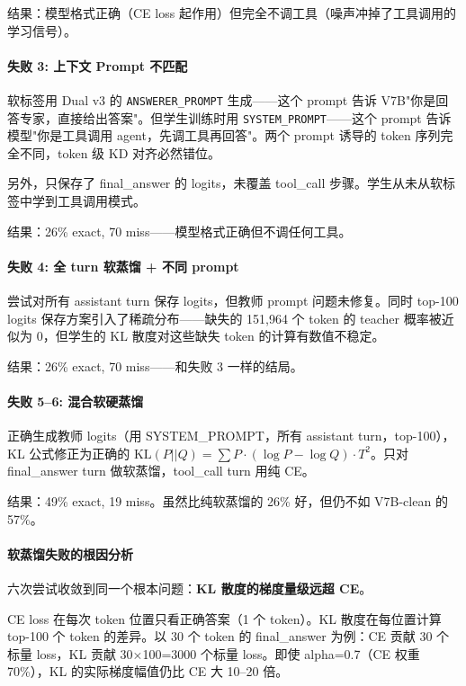\documentclass[12pt,a4paper]{ctexart}
\begin{document}
结果：模型格式正确（CE loss 起作用）但完全不调工具（噪声冲掉了工具调用的学习信号）。

\paragraph*{失败 3: 上下文 Prompt 不匹配}

软标签用 Dual v3 的 \texttt{ANSWERER\_PROMPT} 生成——这个 prompt 告诉 V7B"你是回答专家，直接给出答案"。但学生训练时用 \texttt{SYSTEM\_PROMPT}——这个 prompt 告诉模型"你是工具调用 agent，先调工具再回答"。两个 prompt 诱导的 token 序列完全不同，token 级 KD 对齐必然错位。

另外，只保存了 final\_answer 的 logits，未覆盖 tool\_call 步骤。学生从未从软标签中学到工具调用模式。

结果：26\% exact, 70 miss——模型格式正确但不调任何工具。

\paragraph*{失败 4: 全 turn 软蒸馏 + 不同 prompt}

尝试对所有 assistant turn 保存 logits，但教师 prompt 问题未修复。同时 top-100 logits 保存方案引入了稀疏分布——缺失的 151,964 个 token 的 teacher 概率被近似为 0，但学生的 KL 散度对这些缺失 token 的计算有数值不稳定。

结果：26\% exact, 70 miss——和失败 3 一样的结局。

\paragraph*{失败 5--6: 混合软硬蒸馏}

正确生成教师 logits（用 SYSTEM\_PROMPT，所有 assistant turn，top-100），KL 公式修正为正确的 $\text{KL}(P||Q) = \sum P\cdot(\log P - \log Q) \cdot T^2$。只对 final\_answer turn 做软蒸馏，tool\_call turn 用纯 CE。

结果：49\% exact, 19 miss。虽然比纯软蒸馏的 26\% 好，但仍不如 V7B-clean 的 57\%。

\paragraph*{软蒸馏失败的根因分析}

六次尝试收敛到同一个根本问题：\textbf{KL 散度的梯度量级远超 CE}。

CE loss 在每次 token 位置只看正确答案（1 个 token）。KL 散度在每位置计算 top-100 个 token 的差异。以 30 个 token 的 final\_answer 为例：CE 贡献 30 个标量 loss，KL 贡献 30×100=3000 个标量 loss。即使 alpha=0.7（CE 权重 70\%），KL 的实际梯度幅值仍比 CE 大 10--20 倍。
\end{document}
